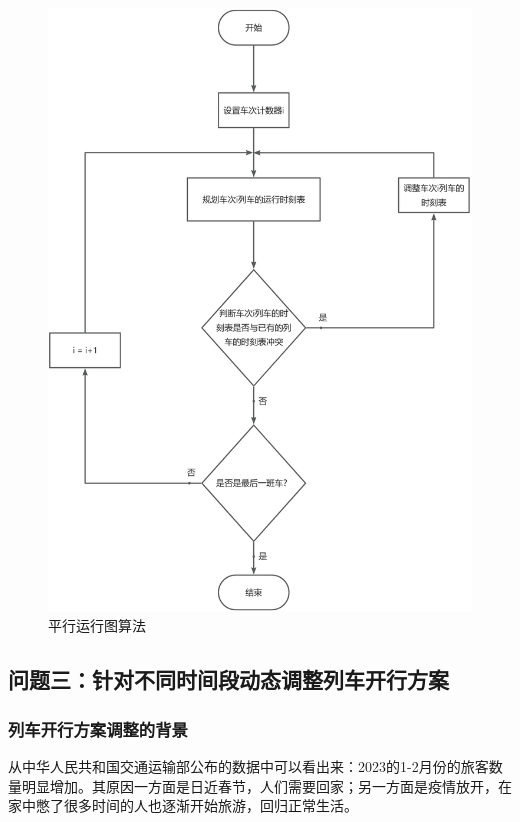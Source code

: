 \begin{figure}[h]
    \centering
    \includegraphics[scale=0.2]{res/figure170309.png}
    \caption{平行运行图算法}
    \label{figure170309}
\end{figure}

\subsection{问题三：针对不同时间段动态调整列车开行方案}

\subsubsection{列车开行方案调整的背景}

从中华人民共和国交通运输部公布的数据中可以看出来：2023的1-2月份的旅客数量明显增加\cite{ChengShiKeYunTongJiShuJuZhongHuaRenMinGongHeGuoJiaoTongYunShuBu}。其原因一方面是日近春节，人们需要回家；另一方面是疫情放开，在家中憋了很多时间的人也逐渐开始旅游，回归正常生活。

